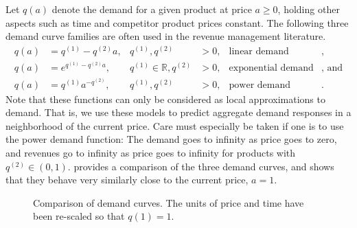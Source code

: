 \documentclass[main.tex]{subfiles}
\begin{document}
Let $q(a)$ denote the demand for a given product at price $a\geq 0$, holding
other aspects such as time and competitor product prices constant.
The following three demand curve families are often used in the
revenue management literature.
\begin{align}\label{eq:demand_fun_lin}
  q(a) &= q^{(1)}-q^{(2)}a,&q^{(1)},q^{(2)}&>0,&\text{linear demand}&,\\
  q(a) &= e^{q^{(1)}-q^{(2)}a},&q^{(1)}\in\mathbb{R},q^{(2)}&>0,&\text{exponential
                                                                  demand}&\text{, and}\\
  q(a) &= q^{(1)}a^{-q^{(2)}},&q^{(1)},q^{(2)}&>0,&\text{power demand}&.\label{eq:demand_fun_pow}
\end{align}
Note that these functions can only be considered as local
approximations to demand. That is, we use these models to predict
aggregate demand responses in a neighborhood of the current
price. Care must especially be taken if one is to use the power demand
function: The demand goes to infinity as price goes to zero, and
revenues go to infinity as price goes to infinity for products with $q^{(2)}\in(0,1)$.
 provides a comparison of the three
demand curves, and shows that they behave very similarly close to the
current price, $a=1$.
\begin{figure}[htbp]
  \centering
  \caption[Comparison of demand curves]{Comparison of demand curves. The units of price and time
    have been re-scaled so that $q(1)=1$.}\label{fig:demandfun_comparison}
\end{figure}
\end{document}
